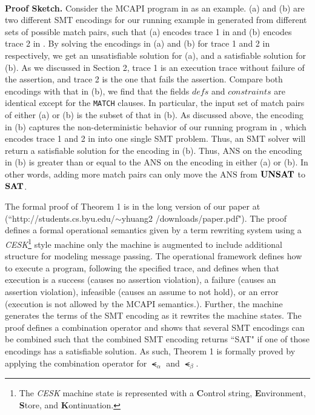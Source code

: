 \\
\textbf{Proof Sketch.}
Consider the MCAPI program in  as an example.
(a) and (b) are two different SMT encodings for our running
example in  generated from different sets of possible match pairs, such that (a) encodes trace 1 in  and (b) encodes trace 2 in . By solving the encodings in (a) and (b) for trace 1 and 2 in  respectively, we get an unsatisfiable solution for (a), and a satisfiable solution for (b). As we discussed in Section 2, trace 1 is an execution trace without failure of the assertion, and trace 2 is the one that fails the assertion. %
Compare both encodings with that in (b), we find that the fields $\mathit{defs}$ and $\mathit{constraints}$ are identical except for the \texttt{MATCH} clauses. In particular, the input set of match pairs of either (a) or (b) is the subset of that in (b). As discussed above, the encoding in (b) captures the non-deterministic behavior of our running program in , which encodes trace 1 and 2 in  into one single SMT problem. Thus, an SMT solver will return a satisfiable solution for the encoding in (b). Thus, $\mathrm{ANS}$ on the encoding in (b) is greater than or equal to the $\mathrm{ANS}$ on the encoding in either (a) or (b). In other words, adding more match pairs can only move the $\mathrm{ANS}$ from $\mathrm{\textbf{UNSAT}}$ to $\mathrm{\textbf{SAT}}$.

The formal proof of Theorem 1 is in the long version of our paper at (``http://students.cs.byu.edu/$\sim$yhuang2 /downloads/paper.pdf"). The proof defines a formal operational semantics given by a term rewriting system using a \textit{CESK}\footnote{The \textit{CESK} machine state is represented with a \textbf{C}ontrol string, \textbf{E}nvironment, \textbf{S}tore, and \textbf{K}ontinuation.} style machine only the machine is augmented to include additional structure for modeling message passing. The operational framework defines how to execute a program, following the specified trace, and defines when that execution is a
success (causes no assertion violation), a failure (causes an assertion violation), infeasible (causes an assume to not hold), or an error (execution is not allowed by the MCAPI semantics.). Further, the machine generates the terms of the SMT encoding as it rewrites the machine states. The proof defines a combination operator and shows that several SMT encodings can be combined such that the combined SMT encoding returns ``SAT" if one of those encodings has a satisfiable solution.  As such, Theorem 1 is formally proved by applying the combination operator for $\smt_{\alpha}$ and $\smt_{\beta}$.

